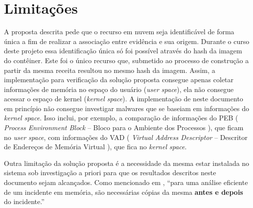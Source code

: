 

\section{Limitações}
\label{sec:proposta-limit}

A proposta descrita pede que o recurso em nuvem seja identificável de forma única a fim de realizar a associação entre evidência e sua origem.
%
Durante o curso deste projeto essa identificação única só foi possível através do hash da imagem do contêiner. Este foi o único recurso que, submetido ao processo de construção a partir da mesma receita resultou no mesmo hash da imagem.
%
Assim, a implementação para verificação da solução proposta consegue apenas coletar informações de memória no espaço do usuário (\textit{user space}), ela não consegue acessar o espaço de kernel (\textit{kernel space}). 
%
A implementação de \fancyname neste documento em princípio não consegue investigar malwares que se baseiam em informações do \textit{kernel space}.
%
Isso inclui, por exemplo, a comparação de informações do PEB ( \textit{Process Environment Block} -- Bloco para o Ambiente dos Processos ), que ficam no \textit{user space}, com informações do VAD ( \textit{Virtual Address Descriptor} -- Descritor de Endereços de Memória Virtual ), que fica no \textit{kernel space}. 
%

%
Outra limitação da solução proposta é a necessidade da mesma estar instalada no sistema sob investigação a priori para que os resultados descritos neste documento sejam alcançados. 
%
Como mencionado em \cite{CaseMemoryForensics:2014}, ``para uma análise eficiente de um incidente em memória, são necessárias cópias da mesma \textbf{antes e depois} do incidente.''

